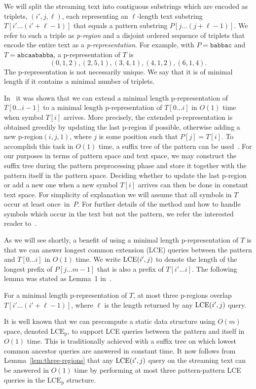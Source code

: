 \documentclass[envcountsame]{llncs}
\newcommand{\upto}{\ensuremath{\ldots}}
\newcommand{\pregion}{\mbox{p-region}\xspace}
\newcommand{\pregions}{\mbox{p-regions}\xspace}
\newcommand{\prepresentation}{\mbox{p-representation}\xspace}
\newcommand{\LCE}{\ensuremath{\textup{LCE}}}
\newcommand{\LCEP}{\ensuremath{\text{LCE}_\text{p}}\xspace}
\begin{document}
We will split the streaming text into contiguous substrings which are encoded as triplets, $(i',j,\ell)$, each representing an $\ell$-length text substring $T[i'\upto (i'+\ell-1)]$ that equals a pattern substring $P[j\upto (j+\ell-1)]$. We refer to such a triple as \emph{\pregion} and a disjoint ordered sequence of triplets that encode the entire text as a \emph{\prepresentation}. For example, with $P=\texttt{babbac}$ and $T=\texttt{abcaababba}$, a \prepresentation of $T$ is \[(0,1,2),(2,5,1),(3,4,1),(4,1,2),(6,1,4).\] The \prepresentation is not necessarily unique. We say that it is of minimal length if it contains a minimal number of triplets.

In~\cite{CS:2010} it was shown that we can extend a minimal length \prepresentation of $T[0\upto i-1]$ to a minimal length \prepresentation of $T[0\upto i]$ in $O(1)$ time when symbol $T[i]$ arrives. More precisely, the extended \prepresentation is obtained greedily by updating the last \pregion if possible, otherwise adding a new \pregion $(i,j,1)$, where $j$ is some position such that $P[j]=T[i]$.
To accomplish this task in $O(1)$ time, a suffix tree of the pattern
can be used~\cite{CS:2010}. For our purposes in terms of pattern space
and text space, we may construct the suffix tree during the pattern
preprocessing phase and store it together with the pattern itself in
the pattern space. Deciding whether to update the last \pregion or add
a new one when a new symbol $T[i]$ arrives can then be done in
constant text space. For simplicity of explanation we will assume that
all symbols in $T$ occur at least once~in~$P$.  For further details of
the method and how to handle symbols which occur in the text but not
the pattern, we refer the interested reader to~\cite{CS:2010}.

As we will see shortly, a benefit of using a minimal length \prepresentation of $T$ is that we can answer longest common extension (LCE) queries between the pattern and $T[0\upto i]$ in $O(1)$ time. We write $\LCE(i',j)$ to denote the length of the longest prefix of $P[j\upto m-1]$ that is also a prefix of $T[i'\upto i]$.
The following lemma was stated as Lemma~1 in~\cite{CS:2010}.

\begin{lemma}
    \label{lem:three-regions}
    For a minimal length \prepresentation of $T$, at most three \pregions overlap $T[i'\upto (i'+\ell-1)]$, where $\ell$ is the length returned by any $\LCE(i',j)$ query.
\end{lemma}

It is well known that we can precompute a static data structure using
$O(m)$ space, denoted \LCEP, to support LCE queries between the
pattern and itself in $O(1)$ time. This is traditionally achieved with
a suffix tree on which lowest common ancestor queries are answered in
constant time. It now follows from Lemma~\ref{lem:three-regions} that
any $\LCE(i',j)$ query on the streaming text can be answered in $O(1)$ time by performing at most three pattern-pattern LCE queries in the \LCEP structure.
\end{document}
